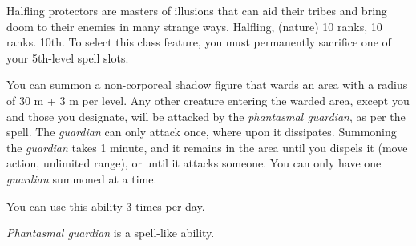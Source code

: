{Halfling protectors are masters of illusions that can aid their tribes and bring doom to their enemies in many strange ways.}
{Halfling,  (nature) 10 ranks,  10 ranks.}
{10th.}
{To select this class feature, you must permanently sacrifice one of your 5th-level spell slots.}
{
	You can summon a non-corporeal shadow figure that wards an area with a radius of 30 m + 3 m per level. Any other creature entering the warded area, except you and those you designate, will be attacked by the \emph{phantasmal guardian}, as per the  spell. The \emph{guardian} can only attack once, where upon it dissipates. Summoning the \emph{guardian} takes 1 minute, and it remains in the area until you dispels it (move action, unlimited range), or until it attacks someone. You can only have one \emph{guardian} summoned at a time.

	You can use this ability 3 times per day.

	\emph{Phantasmal guardian} is a spell-like ability.
}


